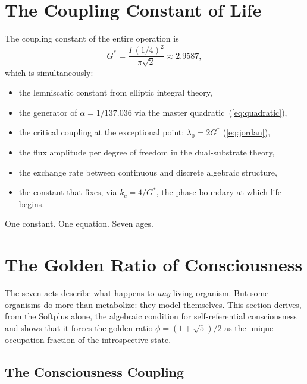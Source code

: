 \documentclass[12pt, letterpaper]{article}
\theoremstyle{plain}
\theoremstyle{definition}
\theoremstyle{remark}
\newcommand{\Gstar}{{G^{*}}}              %
\begin{document}
\section{The Coupling Constant of Life}
\label{sec:coupling}

The coupling constant of the entire operation is
\begin{equation}\label{eq:Gstar_final}
  \Gstar = \frac{\Gamma(1/4)^2}{\pi\sqrt{2}} \approx 2.9587,
\end{equation}
which is simultaneously:
\begin{itemize}[leftmargin=1.5em]
  \item the lemniscatic constant from elliptic integral theory,
  \item the generator of $\alpha = 1/137.036$ via the master quadratic~(\ref{eq:quadratic}),
  \item the critical coupling at the exceptional point: $\lambda_0 = 2\Gstar$ (\ref{eq:jordan}),
  \item the flux amplitude per degree of freedom in the dual-substrate theory,
  \item the exchange rate between continuous and discrete algebraic structure,
  \item the constant that fixes, via $k_c = 4/\Gstar$, the phase boundary at which life begins.
\end{itemize}

\medskip
\noindent
One constant. One equation. Seven ages.


\section{The Golden Ratio of Consciousness}
\label{sec:golden}

The seven acts describe what happens to \emph{any} living organism. But some organisms do more than metabolize: they model themselves. This section derives, from the Softplus alone, the algebraic condition for self-referential consciousness and shows that it forces the golden ratio $\phi = (1+\sqrt{5})/2$ as the unique occupation fraction of the introspective state.

\subsection{The Consciousness Coupling}
\end{document}
